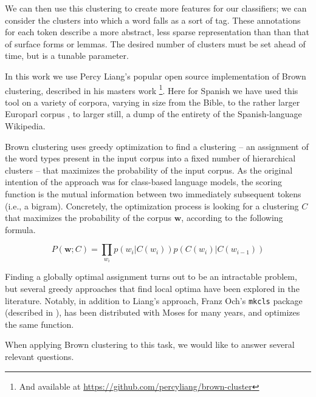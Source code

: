 We can then use this clustering to create more features for our classifiers; we
can consider the clusters into which a word falls as a sort of tag.  These
annotations for each token describe a more abstract, less sparse representation
than than that of surface forms or lemmas. The desired number of clusters must
be set ahead of time, but is a tunable parameter.

In this work we use Percy Liang's popular open source implementation of Brown
clustering, described in his masters work \cite{Liang05semi-supervisedlearning}
\footnote{And available at \url{https://github.com/percyliang/brown-cluster}}.
Here for Spanish we have used this tool on a variety of corpora, varying in
size from the Bible, to the rather larger Europarl corpus \cite{europarl}, to
larger still, a dump of the entirety of the Spanish-language Wikipedia.

Brown clustering uses greedy optimization to find a clustering  -- an assignment
of the word types present in the input corpus into a fixed number of
hierarchical clusters -- that maximizes the probability of the input corpus.  As
the original intention of the approach was for class-based language models, the
scoring function is the mutual information between two immediately subsequent
tokens (i.e., a bigram).  Concretely, the optimization process is looking for a
clustering $C$ that maximizes the probability of the corpus $\boldsymbol{w}$,
according to the following formula.

\begin{equation} \label{eq:brownclassprob}
P(\boldsymbol{w}; C) = \prod_{w_i} p(w_i | C(w_i)) p(C(w_i) | C(w_{i-1}))
\end{equation}

Finding a globally optimal assignment turns out to be an intractable problem,
but several greedy approaches that find local optima have been explored in the
literature.  Notably, in addition to Liang's approach, Franz Och's
\texttt{mkcls} package (described in \cite{och1999efficient}), has been
distributed with Moses for many years, and optimizes the same function.

When applying Brown clustering to this task, we would like to answer several
relevant questions.

